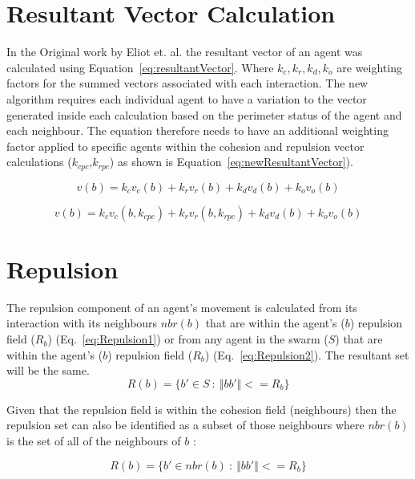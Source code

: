 \documentclass[12pt]{article}
\newcommand{\magn}[1]{\Vert{#1}\Vert}
\begin{document}
\section{Resultant Vector Calculation}
In the Original work by Eliot et. al. the resultant vector of an agent was calculated using Equation~\ref{eq:resultantVector}. Where $k_c,k_r,k_d,k_o$ are weighting factors for the summed vectors associated with each interaction. The new algorithm requires each individual agent to have a variation to the vector generated inside each calculation based on the perimeter status of the agent and each neighbour. The equation therefore needs to have an additional weighting factor applied to specific agents within the cohesion and repulsion vector calculations ($k_{cpc}$,$k_{rpc}$) as shown is Equation~\ref{eq:newResultantVector}).

\begin{equation}\label{eq:resultantVector}
	v(b) = k_cv_c(b) + k_rv_r(b) + k_dv_d(b) + k_ov_o(b)
\end{equation}
	
\begin{equation}\label{eq:newResultantVector}
	v(b) = k_cv_c(b,k_{cpc}) + k_rv_r(b,k_{rpc}) + k_dv_d(b) + k_ov_o(b)
\end{equation}

\section{Repulsion}\label{repulsion}
The repulsion component of an agent's movement is calculated from its interaction with its neighbours $nbr(b)$ that are within the agent's ($b$) repulsion field ($R_b$) (Eq.~\ref{eq:Repulsion1}) or from any agent in the swarm ($S$) that are within the agent's ($b$) repulsion field ($R_b$) (Eq.~\ref{eq:Repulsion2}). The resultant set will be the same.\\

\begin{equation}\label{eq:Repulsion1}
R(b) = \{b' \in S~:~\magn{bb'} <= R_b\}
\end{equation}

Given that the repulsion field is within the cohesion field (neighbours) then the repulsion set can also be identified as a subset of those neighbours where $nbr(b)$ is the set of all of the neighbours of $b$ \cite{eliot2017methods}:

\begin{equation}\label{eq:Repulsion2}
R(b) = \{b' \in nbr(b)~:~\magn{bb'} <= R_b\}
\end{equation}
\end{document}

